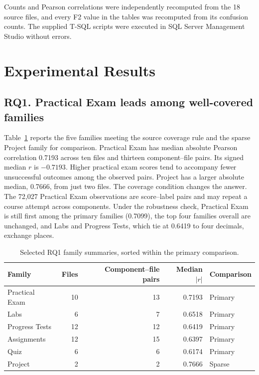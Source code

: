 \documentclass[runningheads]{llncs}
\begin{document}
Counts and Pearson correlations were independently recomputed from the 18 source files, and every F2 value in the tables was recomputed from its confusion counts.
The supplied T-SQL scripts were executed in SQL Server Management Studio without errors.

\section{Experimental Results}
\subsection{RQ1. Practical Exam leads among well-covered families}
Table~\ref{tab:rq1} reports the five families meeting the source coverage rule and the sparse Project family for comparison. Practical Exam has median absolute Pearson correlation 0.7193 across ten files and thirteen component--file pairs. Its signed median $r$ is $-0.7193$. Higher practical exam scores tend to accompany fewer unsuccessful outcomes among the observed pairs. Project has a larger absolute median, 0.7666, from just two files. The coverage condition changes the answer. The 72,027 Practical Exam observations are score--label pairs and may repeat a course attempt across components. Under the robustness check, Practical Exam is still first among the primary families (0.7099), the top four families overall are unchanged, and Labs and Progress Tests, which tie at 0.6419 to four decimals, exchange places.

\begin{table}[h]
\caption{Selected RQ1 family summaries, sorted within the primary comparison.}
\label{tab:rq1}
\centering
\begin{tabular}{lrrrl}
\toprule
Family & Files & Component--file pairs & Median $|r|$ & Comparison \\
\midrule
Practical Exam & 10 & 13 & 0.7193 & Primary \\
Labs & 6 & 7 & 0.6518 & Primary \\
Progress Tests & 12 & 12 & 0.6419 & Primary \\
Assignments & 12 & 15 & 0.6397 & Primary \\
Quiz & 6 & 6 & 0.6174 & Primary \\
Project & 2 & 2 & 0.7666 & Sparse \\
\bottomrule
\end{tabular}
\end{table}
\end{document}
